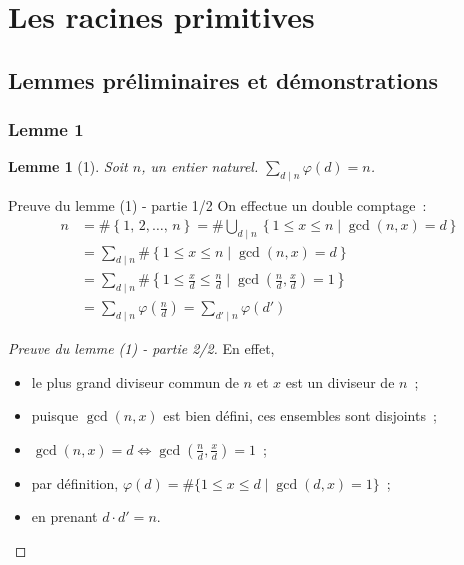 \documentclass[10pt, mathserif]{beamer}
\newtheorem{lem}[thm]{Lemme}
\theoremstyle{definition}
\theoremstyle{remark}
\begin{document}
\section{Les racines primitives}
	\subsection{Lemmes préliminaires et démonstrations}
	\begin{frame}
		\frametitle{Lemme 1}
		\begin{lem}[1]
			Soit $n$, un entier naturel. %
			$\sum_{d \mid n} \varphi(d) = n$.
		\end{lem}

		\begin{block}{Preuve du lemme (1) - partie 1/2}
			On effectue un double comptage~:
			\[\begin{aligned}
			n &= \#\left\{1,\,2,\ldots,\,n\right\} = \#\bigcup_{d\mid n}\left\{1\le x\le n \mid \gcd(n,x)=d\right\} \\
			  &= \sum_{d\mid n}\#\left\{1\le x\le n\mid \gcd(n,x)=d\right\} \\
			  &= \sum_{d\mid n}\#\left\{1\le \frac{x}{d}\le \frac{n}{d}\mid \gcd\left(\frac{n}{d},\frac{x}{d}\right)=1 \right\} \\
			  &= \sum_{d\mid n}\varphi\left(\frac{n}{d}\right) = \sum_{d'\mid n}\varphi(d')
			\end{aligned}\]
		\end{block}
	\end{frame}

	\begin{frame}
		\begin{proof}[Preuve du lemme (1) - partie 2/2]
			En effet,
			\begin{itemize}
				\item le plus grand diviseur commun de $n$ et $x$ est un diviseur de $n$~;
				\item puisque $\gcd(n,x)$ est bien défini, ces ensembles sont disjoints~;
				\item $\gcd(n,x)=d\Longleftrightarrow \gcd\left(\frac{n}{d},\frac{x}{d}\right)=1$~;
				\item par définition, $\varphi(d)=\#\{1\le x\le d\mid \gcd(d,x)=1\}$~;
				\item en prenant $d\cdot d'=n$.
			\end{itemize}
		\end{proof}
	\end{frame}
\end{document}
